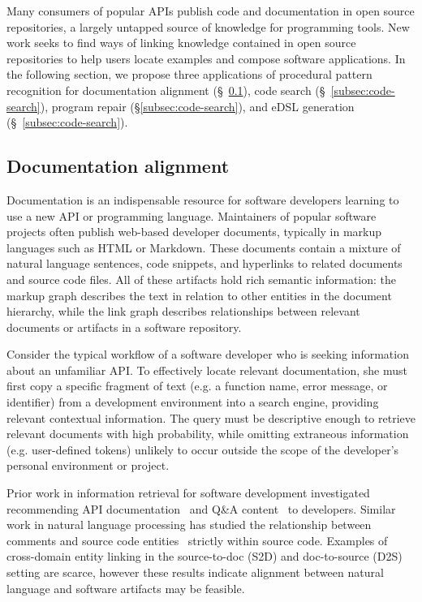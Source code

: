 \documentclass[10pt]{article}
\begin{document}
Many consumers of popular APIs publish code and documentation in open source repositories, a largely untapped source of knowledge for programming tools. New work seeks to find ways of linking knowledge contained in open source repositories to help users locate examples and compose software applications. In the following section, we propose three applications of procedural pattern recognition for documentation alignment (\S~\ref{subsec:tracelink}), code search (\S~\ref{subsec:code-search}), program repair (\S\ref{subsec:code-search}), and eDSL generation (\S~\ref{subsec:code-search}).

\pagebreak\subsection{Documentation alignment}\label{subsec:tracelink}

Documentation is an indispensable resource for software developers learning to use a new API or programming language. Maintainers of popular software projects often publish web-based developer documents, typically in markup languages such as HTML or Markdown. These documents contain a mixture of natural language sentences, code snippets, and hyperlinks to related documents and source code files. All of these artifacts hold rich semantic information: the markup graph describes the text in relation to other entities in the document hierarchy, while the link graph describes relationships between relevant documents or artifacts in a software repository.

Consider the typical workflow of a software developer who is seeking information about an unfamiliar API. To effectively locate relevant documentation, she must first copy a specific fragment of text (e.g. a function name, error message, or identifier) from a development environment into a search engine, providing relevant contextual information. The query must be descriptive enough to retrieve relevant documents with high probability, while omitting extraneous information (e.g. user-defined tokens) unlikely to occur outside the scope of the developer's personal environment or project.

Prior work in information retrieval for software development investigated recommending API documentation~\cite{robillard2015recommending} and Q\&A content~\cite{treude2016augmenting} to developers. Similar work in natural language processing has studied the relationship between comments and source code entities~\cite{iyer2018mapping, panthaplackel2020associating} strictly within source code. Examples of cross-domain entity linking in the source-to-doc (S2D) and doc-to-source (D2S) setting are scarce, however these results indicate alignment between natural language and software artifacts may be feasible.
\end{document}
